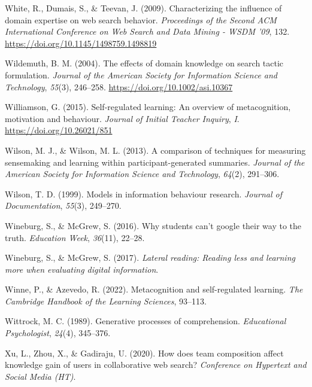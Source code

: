 \documentclass[letterpaper, nobind]{templates/ociamthesis}
\newlength{\cslhangindent}
\newenvironment{CSLReferences}[2] %
 {%
  \setlength{\parindent}{0pt}
  \ifodd #1
  \let\oldpar\par
  \def\par{\hangindent=\cslhangindent\oldpar}
  \fi
  \setlength{\parskip}{1mm}
  \setlength{\baselineskip}{6mm}
 }%
 {}
\begin{document}
\begin{CSLReferences}{1}{0}
\leavevmode{}%
White, R., Dumais, S., \& Teevan, J. (2009). Characterizing the influence of domain expertise on web search behavior. \emph{Proceedings of the {Second ACM International Conference} on {Web Search} and {Data Mining} - {WSDM} '09}, 132. \url{https://doi.org/10.1145/1498759.1498819}

\leavevmode{}%
Wildemuth, B. M. (2004). The effects of domain knowledge on search tactic formulation. \emph{Journal of the American Society for Information Science and Technology}, \emph{55}(3), 246--258. \url{https://doi.org/10.1002/asi.10367}

\leavevmode{}%
Williamson, G. (2015). Self-regulated learning: An overview of metacognition, motivation and behaviour. \emph{Journal of Initial Teacher Inquiry}, \emph{I}. \url{https://doi.org/10.26021/851}

\leavevmode{}%
Wilson, M. J., \& Wilson, M. L. (2013). A comparison of techniques for measuring sensemaking and learning within participant-generated summaries. \emph{Journal of the American Society for Information Science and Technology}, \emph{64}(2), 291--306.

\leavevmode{}%
Wilson, T. D. (1999). Models in information behaviour research. \emph{Journal of Documentation}, \emph{55}(3), 249--270.

\leavevmode{}%
Wineburg, S., \& McGrew, S. (2016). Why students can't google their way to the truth. \emph{Education Week}, \emph{36}(11), 22--28.

\leavevmode{}%
Wineburg, S., \& McGrew, S. (2017). \emph{Lateral reading: Reading less and learning more when evaluating digital information}.

\leavevmode{}%
Winne, P., \& Azevedo, R. (2022). Metacognition and self-regulated learning. \emph{The Cambridge Handbook of the Learning Sciences}, 93--113.

\leavevmode{}%
Wittrock, M. C. (1989). Generative processes of comprehension. \emph{Educational Psychologist}, \emph{24}(4), 345--376.

\leavevmode{}%
Xu, L., Zhou, X., \& Gadiraju, U. (2020). How does team composition affect knowledge gain of users in collaborative web search? \emph{Conference on Hypertext and Social Media (HT)}.


\end{CSLReferences}
\end{document}
